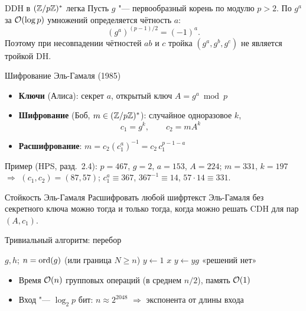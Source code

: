 \documentclass{ca-slides}
\begin{document}
\begin{theoremframe}[proposition]{DDH в $(\mathbb{Z}/p\mathbb{Z})^{*}$ легка}
  Пусть $g$ "--- первообразный корень по модулю $p > 2$. По $g^a$ за $\mathcal{O}(\log p)$ умножений
  определяется чётность $a$:
  \[
    (g^a)^{(p-1)/2} = (-1)^a .
  \]
  Поэтому при несовпадении чётностей $ab$ и $c$ тройка $(g^a, g^b, g^c)$ не является тройкой DH.
\end{theoremframe}

\begin{canvasframe}{Шифрование Эль-Гамаля (1985)}
  \begin{itemize}
    \item \textbf{Ключи} (Алиса): секрет $a$, открытый ключ $A = g^a \bmod p$
    \item \textbf{Шифрование} (Боб, $m \in (\mathbb{Z}/p\mathbb{Z})^{*}$): случайное одноразовое $k$,
      \[
        c_1 = g^k, \qquad c_2 = m A^k
      \]
    \item \textbf{Расшифрование}: $m = c_2 (c_1^a)^{-1} = c_2\, c_1^{p - 1 - a}$
  \end{itemize}
  Пример (HPS, разд.~2.4): $p = 467$, $g = 2$, $a = 153$, $A = 224$; $m = 331$, $k = 197$
  $\Rightarrow$ $(c_1, c_2) = (87, 57)$; $c_1^a \equiv 367$, $367^{-1} \equiv 14$, $57 \cdot 14
  \equiv 331$.
  \penspace[0.12\textheight]
\end{canvasframe}

\begin{theoremframe}[proposition]{Стойкость Эль-Гамаля}
  Расшифровать любой шифртекст Эль-Гамаля без секретного ключа можно тогда и только тогда, когда
  можно решать CDH для пар $(A, c_1)$.
\end{theoremframe}

\begin{canvasframe}{Тривиальный алгоритм: перебор}
  \begin{algorithm}[перебор]
  \begin{algorithmic}[1]
    \Require $g, h$; $n = \operatorname{ord}(g)$ (или граница $N \ge n$)
    \State $y \gets 1$
       \Return $x$ \EndIf
      \State $y \gets y g$
    \EndFor
    \State \Return «решений нет»
  \end{algorithmic}
  \end{algorithm}
  \begin{itemize}
    \item Время $\mathcal{O}(n)$ групповых операций (в среднем $n/2$), память $\mathcal{O}(1)$
    \item Вход "--- $\log_2 p$ бит: $n \approx 2^{2048}$ $\Rightarrow$ экспонента от длины входа
  \end{itemize}
\end{canvasframe}
\end{document}
